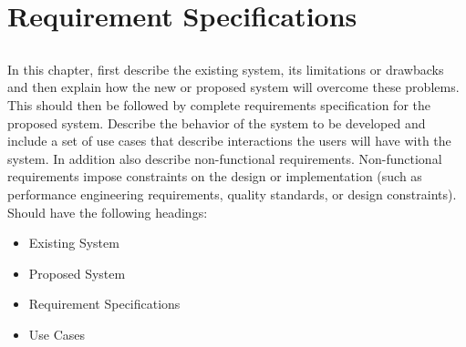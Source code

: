 \chapter{Requirement Specifications} \label{chap:reqs}


\section*{}
In this chapter, first describe the existing system, its limitations or drawbacks and then explain how the new or proposed system will overcome these problems. This should then be followed by complete requirements specification for the proposed system.  Describe the behavior of the system to be developed and include a set of use cases that describe interactions the users will have with the system. In addition also describe non-functional requirements. Non-functional requirements impose constraints on the design or implementation (such as performance engineering requirements, quality standards, or design constraints). Should have the following headings:
\begin{itemize}
	\item Existing System
	\item Proposed System
	\item Requirement Specifications
	\item Use Cases
\end{itemize}
 

